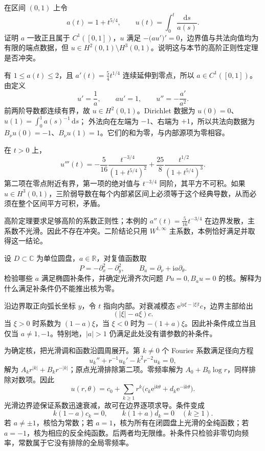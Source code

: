 \begin{exercise}\label{g3:ex:coefficient-regularity-boundary}
	在区间 \((0,1)\) 上令
	\[
	a(t)=1+t^{5/4},\qquad
	u(t)=\int_0^t\frac{\mathrm ds}{a(s)}.
	\]
	证明 \(a\) 一致正且属于 \(C^1([0,1])\)，\(u\) 满足
	\(-\bigl(au'\bigr)'=0\)，边界值与共法向值均为有限的端点数据，但
	\(u\in H^2(0,1)\setminus H^3(0,1)\)。说明这与本节的高阶正则性定理是否冲突。
\end{exercise}
\begin{solution}
	有 \(1\le a(t)\le2\)，且
	\(a'(t)=\tfrac54t^{1/4}\) 连续延伸到零点，所以 \(a\in C^1([0,1])\)。由定义
	\[
	u'=\frac1a,\qquad au'=1,\qquad
	u''=-\frac{a'}{a^2}.
	\]
	前两阶导数都连续有界，故 \(u\in H^2(0,1)\)。Dirichlet 数据为
	\(u(0)=0\)、\(u(1)=\int_0^1a(s)^{-1}\,\mathrm ds\)；
	外法向在左端为 \(-1\)、右端为 \(+1\)，所以共法向数据为
	\(B_\nu u(0)=-1\)、\(B_\nu u(1)=1\)。它们的和为零，与内部源项为零相容。

	在 \(t>0\) 上，
	\[
	u'''(t)
	=-\frac{5}{16}\frac{t^{-3/4}}{(1+t^{5/4})^2}
			+\frac{25}{8}\frac{t^{1/2}}{(1+t^{5/4})^3}.
	\]
	第二项在零点附近有界，第一项的绝对值与 \(t^{-3/4}\) 同阶，其平方不可积。如果 \(u\in H^3(0,1)\)，三阶弱导数在每个内部紧区间上必须等于这个经典导数，从而必须在整个区间平方可积，矛盾。

	高阶定理要求足够高阶的系数正则性；本例的
	\(a''(t)=\tfrac5{16}t^{-3/4}\) 在边界发散，主系数不光滑。因此不存在冲突。二阶结论只用 \(W^{1,\infty}\) 主系数，本例恰好满足并取得这一结论。
\end{solution}

\begin{exercise}\label{g3:ex:complex-oblique-boundary-family}
	设 \(D\subset\mathbb C\) 为单位圆盘，\(a\in\mathbb R\)，对复值函数取
	\[
		P=-\partial_x^2-\partial_y^2,\qquad
		B_a=\partial_\nu+\mathrm i a\partial_\theta.
	\]
	检验哪些 \(a\) 满足椭圆补条件，并确定光滑齐次问题 \(Pu=0,B_au=0\) 的核。解释为什么满足补条件仍不能推出核为零。
\end{exercise}
\begin{solution}
	沿边界取正向弧长坐标 \(y\)，令 \(t\) 指向内部。对衰减模态 \(\mathrm e^{\mathrm i y\xi-|\xi|t}c\)，边界主部给出
	\[
		(|\xi|-a\xi)c.
	\]
	当 \(\xi>0\) 时系数为 \((1-a)\xi\)，当 \(\xi<0\) 时为 \(-(1+a)\xi\)。因此补条件成立当且仅当 \(a\ne1,-1\)。特别地，\(|a|>1\) 仍满足此处没有谱参数的补条件。

	为确定核，把光滑调和函数沿圆周展开。第 \(k\ne0\) 个 Fourier 系数满足径向方程
	\[
		u_k''+r^{-1}u_k'-k^2r^{-2}u_k=0,
	\]
	解为 \(A_kr^{|k|}+B_kr^{-|k|}\)；原点光滑排除第二项。零频率解为 \(A_0+B_0\log r\)，同样排除对数项。因此
	\[
		u(r,\theta)=c_0+\sum_{k\ge1}r^k
		\bigl(c_k\mathrm e^{\mathrm i k\theta}
		+d_k\mathrm e^{-\mathrm i k\theta}\bigr).
	\]
	光滑边界迹保证系数迅速衰减，故可在边界逐项求导。条件变成
	\[
		k(1-a)c_k=0,\qquad k(1+a)d_k=0\quad(k\ge1).
	\]
	若 \(a\ne\pm1\)，核恰为常数；若 \(a=1\)，核为所有在闭圆盘上光滑的全纯函数；若 \(a=-1\)，核为相应的反全纯函数。后两者均无限维。补条件只检验非零切向频率，常数属于它没有排除的全局零频率。
\end{solution}


